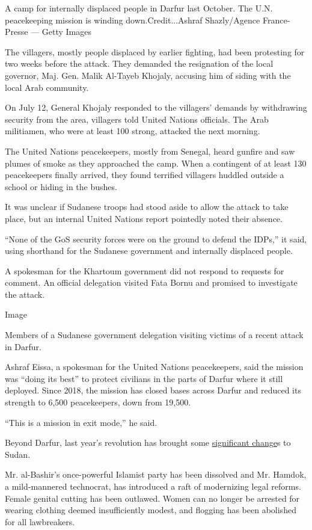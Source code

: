 A camp for internally displaced people in Darfur last October. The U.N.
peacekeeping mission is winding down.Credit...Ashraf Shazly/Agence
France-Presse --- Getty Images

The villagers, mostly people displaced by earlier fighting, had been
protesting for two weeks before the attack. They demanded the
resignation of the local governor, Maj. Gen. Malik Al-Tayeb Khojaly,
accusing him of siding with the local Arab community.

On July 12, General Khojaly responded to the villagers' demands by
withdrawing security from the area, villagers told United Nations
officials. The Arab militiamen, who were at least 100 strong, attacked
the next morning.

The United Nations peacekeepers, mostly from Senegal, heard gunfire and
saw plumes of smoke as they approached the camp. When a contingent of at
least 130 peacekeepers finally arrived, they found terrified villagers
huddled outside a school or hiding in the bushes.

It was unclear if Sudanese troops had stood aside to allow the attack to
take place, but an internal United Nations report pointedly noted their
absence.

``None of the GoS security forces were on the ground to defend the
IDPs,'' it said, using shorthand for the Sudanese government and
internally displaced people.

A spokesman for the Khartoum government did not respond to requests for
comment. An official delegation visited Fata Bornu and promised to
investigate the attack.

Image

Members of a Sudanese government delegation visiting victims of a recent
attack in Darfur.

Ashraf Eissa, a spokesman for the United Nations peacekeepers, said the
mission was ``doing its best'' to protect civilians in the parts of
Darfur where it still deployed. Since 2018, the mission has closed bases
across Darfur and reduced its strength to 6,500 peacekeepers, down from
19,500.

``This is a mission in exit mode,'' he said.

Beyond Darfur, last year's revolution has brought some
\href{https://www.nytimes3xbfgragh.onion/2020/07/13/world/africa/sudan-fgm-alcohol-flogging.html}{significant
change}s to Sudan.

Mr. al-Bashir's once-powerful Islamist party has been dissolved and Mr.
Hamdok, a mild-mannered technocrat, has introduced a raft of modernizing
legal reforms. Female genital cutting has been outlawed. Women can no
longer be arrested for wearing clothing deemed insufficiently modest,
and flogging has been abolished for all lawbreakers.

